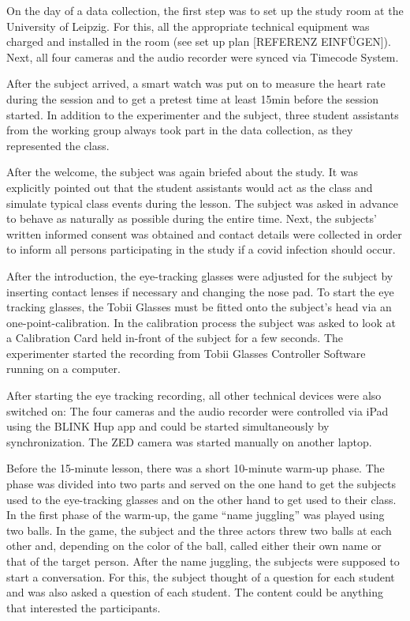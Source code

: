 \documentclass[
  man]{apa6}
\begin{document}
On the day of a data collection, the first step was to set up the study room at the University of Leipzig. For this, all the appropriate technical equipment was charged and installed in the room (see set up plan {[}REFERENZ EINFÜGEN{]}). Next, all four cameras and the audio recorder were synced via Timecode System.

After the subject arrived, a smart watch was put on to measure the heart rate during the session and to get a pretest time at least 15min before the session started. In addition to the experimenter and the subject, three student assistants from the working group always took part in the data collection, as they represented the class.

After the welcome, the subject was again briefed about the study. It was explicitly pointed out that the student assistants would act as the class and simulate typical class events during the lesson. The subject was asked in advance to behave as naturally as possible during the entire time. Next, the subjects' written informed consent was obtained and contact details were collected in order to inform all persons participating in the study if a covid infection should occur.

After the introduction, the eye-tracking glasses were adjusted for the subject by inserting contact lenses if necessary and changing the nose pad. To start the eye tracking glasses, the Tobii Glasses must be fitted onto the subject's head via an one-point-calibration. In the calibration process the subject was asked to look at a Calibration Card held in-front of the subject for a few seconds. The experimenter started the recording from Tobii Glasses Controller Software running on a computer.

After starting the eye tracking recording, all other technical devices were also switched on: The four cameras and the audio recorder were controlled via iPad using the BLINK Hup app and could be started simultaneously by synchronization. The ZED camera was started manually on another laptop.

Before the 15-minute lesson, there was a short 10-minute warm-up phase. The phase was divided into two parts and served on the one hand to get the subjects used to the eye-tracking glasses and on the other hand to get used to their class. In the first phase of the warm-up, the game ``name juggling'' was played using two balls. In the game, the subject and the three actors threw two balls at each other and, depending on the color of the ball, called either their own name or that of the target person. After the name juggling, the subjects were supposed to start a conversation. For this, the subject thought of a question for each student and was also asked a question of each student. The content could be anything that interested the participants.
\end{document}
